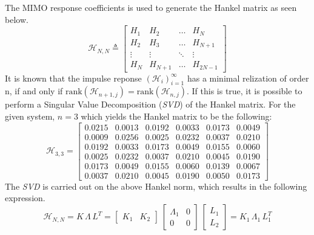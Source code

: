 The MIMO response coefficients is used to generate the Hankel matrix as seen below.
\begin{equation}
    \mathcal{H}_{N,N}\triangleq
    \begin{bmatrix}
        H_1 & H_2 & \dots & H_N \\
        H_2 & H_3 & \dots & H_{N+1} \\
        \vdots & \vdots & \ddots & \vdots \\
        H_N & H_{N+1} & \dots & H_{2N-1}
    \end{bmatrix}
\end{equation}
It is known that the impulse reponse $(\mathcal{H}_i)^\infty_{i=1}$ has a minimal relization of order n, if and only if $\text{rank}(\mathcal{H}_{n+1,j})=\text{rank}(\mathcal{H}_{n,j})$. If this is true, it is possible to perform a Singular Value Decomposition (\textit{SVD}) of the Hankel matrix. For the given system, $n=3$ which yields the Hankel matrix to be the following:
\begin{equation}
    \mathcal{H}_{3,3}=\begin{bmatrix}
        0.0215 & 0.0013 & 0.0192 & 0.0033 & 0.0173 & 0.0049\\
        0.0009 & 0.0256 & 0.0025 & 0.0232 & 0.0037 & 0.0210\\
        0.0192 & 0.0033 & 0.0173 & 0.0049 & 0.0155 & 0.0060\\
        0.0025 & 0.0232 & 0.0037 & 0.0210 & 0.0045 & 0.0190\\
        0.0173 & 0.0049 & 0.0155 & 0.0060 & 0.0139 & 0.0067\\
        0.0037 & 0.0210 & 0.0045 & 0.0190 & 0.0050 & 0.0173
    \end{bmatrix}
\end{equation}
The \textit{SVD} is carried out on the above Hankel norm, which results in the following expression.
\begin{equation}
    \mathcal{H}_{N,N}=K\,\Lambda\,L^T=
    \begin{bmatrix}
        K_1 & K_2
    \end{bmatrix}\,
    \begin{bmatrix}
        \Lambda_1 & 0\\
        0 & 0
    \end{bmatrix}\,
    \begin{bmatrix}
        L_1 \\ L_2
    \end{bmatrix}
    = K_1\,\Lambda_1\,L_1^T
\end{equation}
